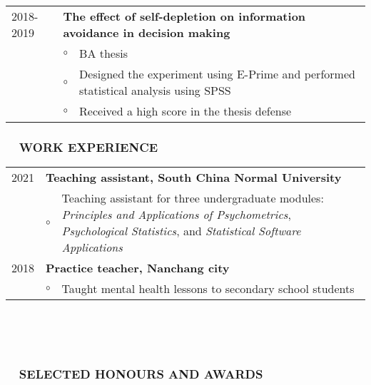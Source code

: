 \documentclass[a4paper, 12pt]{article}
\begin{document}
\begin{tabularx}{\textwidth}{p{2cm} p{0.1cm} X}
    2018-2019 & \multicolumn{2}{X}{\textbf{The effect of self-depletion on information avoidance in decision making}} \\
    & $\circ$ & BA thesis \\
    & $\circ$ & Designed the experiment using E-Prime and performed statistical analysis using SPSS \\
    & $\circ$ & Received a high score in the thesis defense \\

    \end{tabularx}

\subsubsection*{ \ \ WORK EXPERIENCE}

\begin{tabularx}{\textwidth}{p{2cm} p{0.1cm} X}


    2021 & \multicolumn{2}{X}{\textbf{Teaching assistant, South China Normal University}} \\
    & $ \circ $ & Teaching assistant for three undergraduate modules: \textit{Principles and Applications of Psychometrics}, \textit{Psychological Statistics}, and \textit{Statistical Software Applications} \\

    2018 & \multicolumn{2}{X}{\textbf{Practice teacher, Nanchang city}} \\
    & $ \circ $ & Taught mental health lessons to secondary school students

    \end{tabularx}

\  \par 
\  \par 



\subsubsection*{ \ \ SELECTED HONOURS AND AWARDS}
\end{document}
